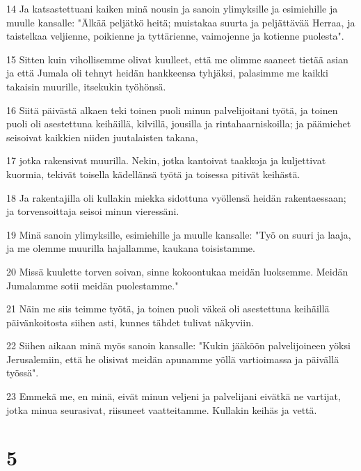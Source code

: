 \par 14 Ja katsastettuani kaiken minä nousin ja sanoin ylimyksille ja esimiehille ja muulle kansalle: "Älkää peljätkö heitä; muistakaa suurta ja peljättävää Herraa, ja taistelkaa veljienne, poikienne ja tyttärienne, vaimojenne ja kotienne puolesta".
\par 15 Sitten kuin vihollisemme olivat kuulleet, että me olimme saaneet tietää asian ja että Jumala oli tehnyt heidän hankkeensa tyhjäksi, palasimme me kaikki takaisin muurille, itsekukin työhönsä.
\par 16 Siitä päivästä alkaen teki toinen puoli minun palvelijoitani työtä, ja toinen puoli oli asestettuna keihäillä, kilvillä, jousilla ja rintahaarniskoilla; ja päämiehet seisoivat kaikkien niiden juutalaisten takana,
\par 17 jotka rakensivat muurilla. Nekin, jotka kantoivat taakkoja ja kuljettivat kuormia, tekivät toisella kädellänsä työtä ja toisessa pitivät keihästä.
\par 18 Ja rakentajilla oli kullakin miekka sidottuna vyöllensä heidän rakentaessaan; ja torvensoittaja seisoi minun vieressäni.
\par 19 Minä sanoin ylimyksille, esimiehille ja muulle kansalle: "Työ on suuri ja laaja, ja me olemme muurilla hajallamme, kaukana toisistamme.
\par 20 Missä kuulette torven soivan, sinne kokoontukaa meidän luoksemme. Meidän Jumalamme sotii meidän puolestamme."
\par 21 Näin me siis teimme työtä, ja toinen puoli väkeä oli asestettuna keihäillä päivänkoitosta siihen asti, kunnes tähdet tulivat näkyviin.
\par 22 Siihen aikaan minä myös sanoin kansalle: "Kukin jääköön palvelijoineen yöksi Jerusalemiin, että he olisivat meidän apunamme yöllä vartioimassa ja päivällä työssä".
\par 23 Emmekä me, en minä, eivät minun veljeni ja palvelijani eivätkä ne vartijat, jotka minua seurasivat, riisuneet vaatteitamme. Kullakin keihäs ja vettä.

\chapter{5}

